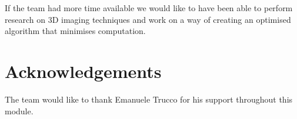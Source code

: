 \documentclass[twocolumn]{article}
\begin{document}
If the team had more time available we would like to have been able to perform research on 3D imaging techniques and work on a way of creating an optimised algorithm that minimises computation. 


\section*{Acknowledgements}
The team would like to thank Emanuele Trucco for his support throughout this module. 





\end{document}
